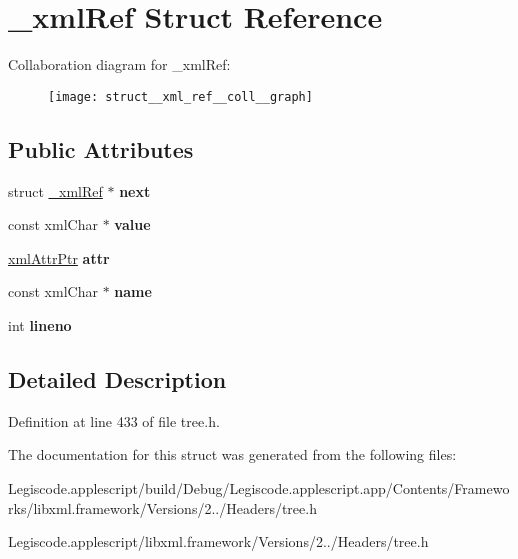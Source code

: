 \hypertarget{struct__xml_ref}{\section{\-\_\-xml\-Ref Struct Reference}
\label{struct__xml_ref}
}


Collaboration diagram for \-\_\-xml\-Ref\-:
\nopagebreak
\begin{figure}[H]
\begin{center}
\leavevmode
\texttt{[image: struct\_\_xml\_ref\_\_coll\_\_graph]}
\end{center}
\end{figure}
\subsection*{Public Attributes}
\begin{DoxyCompactItemize}
\item 
\hypertarget{struct__xml_ref_a687313439b7753f7c2d42206e617ebdd}{struct \hyperlink{struct__xml_ref}{\-\_\-xml\-Ref} $\ast$ {\bfseries next}}\label{struct__xml_ref_a687313439b7753f7c2d42206e617ebdd}

\item 
\hypertarget{struct__xml_ref_a99f6334019561ed21376802349779d68}{const xml\-Char $\ast$ {\bfseries value}}\label{struct__xml_ref_a99f6334019561ed21376802349779d68}

\item 
\hypertarget{struct__xml_ref_a3ff97e4e127f1749ab2e59fdec0f8a8e}{\hyperlink{struct__xml_attr}{xml\-Attr\-Ptr} {\bfseries attr}}\label{struct__xml_ref_a3ff97e4e127f1749ab2e59fdec0f8a8e}

\item 
\hypertarget{struct__xml_ref_a6116f256b8edfa20d1ddc8cee7a320eb}{const xml\-Char $\ast$ {\bfseries name}}\label{struct__xml_ref_a6116f256b8edfa20d1ddc8cee7a320eb}

\item 
\hypertarget{struct__xml_ref_aa9d570e7f96cc7647c9b7fe96fc10eca}{int {\bfseries lineno}}\label{struct__xml_ref_aa9d570e7f96cc7647c9b7fe96fc10eca}

\end{DoxyCompactItemize}


\subsection{Detailed Description}


Definition at line 433 of file tree.\-h.



The documentation for this struct was generated from the following files\-:\begin{DoxyCompactItemize}
\item 
Legiscode.\-applescript/build/\-Debug/\-Legiscode.\-applescript.\-app/\-Contents/\-Frameworks/libxml.\-framework/\-Versions/2../\-Headers/tree.\-h\item 
Legiscode.\-applescript/libxml.\-framework/\-Versions/2../\-Headers/tree.\-h\end{DoxyCompactItemize}
